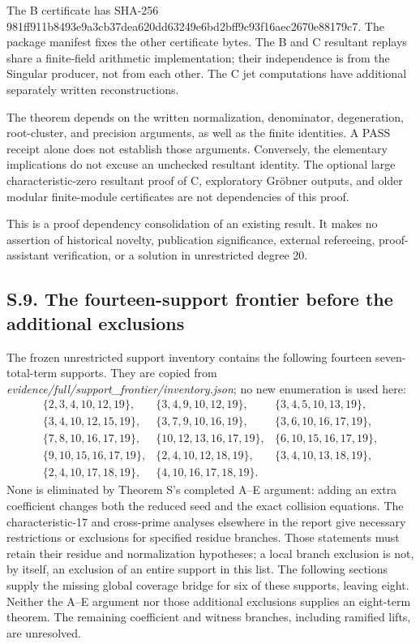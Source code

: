 \documentclass[
  british,
  10pt,
]{article}
\begin{document}
The B certificate has SHA-256
981ff911b8493e9a3cb37dea620dd63249e6bd2bff9c93f16aec2670e88179c7. The
package manifest fixes the other certificate bytes. The B and C
resultant replays share a finite-field arithmetic implementation; their
independence is from the Singular producer, not from each other. The C
jet computations have additional separately written reconstructions.

The theorem depends on the written normalization, denominator,
degeneration, root-cluster, and precision arguments, as well as the
finite identities. A PASS receipt alone does not establish those
arguments. Conversely, the elementary implications do not excuse an
unchecked resultant identity. The optional large characteristic-zero
resultant proof of C, exploratory Gröbner outputs, and older modular
finite-module certificates are not dependencies of this proof.

This is a proof dependency consolidation of an existing result. It makes
no assertion of historical novelty, publication significance, external
refereeing, proof-assistant verification, or a solution in unrestricted
degree 20.

\subsection{S.9. The fourteen-support frontier before the additional
exclusions}\label{s.9.-the-fourteen-support-frontier-before-the-additional-exclusions}

The frozen unrestricted support inventory contains the following
fourteen seven-total-term supports. They are copied from
\emph{evidence/full/support\_frontier/inventory.json}; no new
enumeration is used here: \[
\begin{array}{lll}
\{2,3,4,10,12,19\},&
\{3,4,9,10,12,19\},&
\{3,4,5,10,13,19\},\\
\{3,4,10,12,15,19\},&
\{3,7,9,10,16,19\},&
\{3,6,10,16,17,19\},\\
\{7,8,10,16,17,19\},&
\{10,12,13,16,17,19\},&
\{6,10,15,16,17,19\},\\
\{9,10,15,16,17,19\},&
\{2,4,10,12,18,19\},&
\{3,4,10,13,18,19\},\\
\{2,4,10,17,18,19\},&
\{4,10,16,17,18,19\}.&
\end{array}
\] None is eliminated by Theorem S's completed A--E argument: adding an
extra coefficient changes both the reduced seed and the exact collision
equations. The characteristic-17 and cross-prime analyses elsewhere in
the report give necessary restrictions or exclusions for specified
residue branches. Those statements must retain their residue and
normalization hypotheses; a local branch exclusion is not, by itself, an
exclusion of an entire support in this list. The following sections
supply the missing global coverage bridge for six of these supports,
leaving eight. Neither the A--E argument nor those additional exclusions
supplies an eight-term theorem. The remaining coefficient and witness
branches, including ramified lifts, are unresolved.
\end{document}
